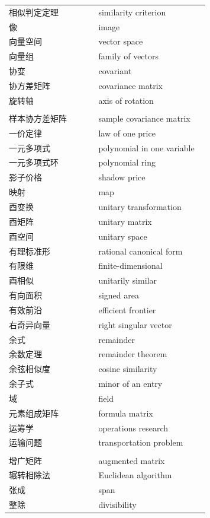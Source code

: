 {\begin{longtable}{p{0.42\linewidth}p{0.52\linewidth}}
		相似判定定理 & similarity criterion \\
		像 & image \\
		向量空间 & vector space \\
		向量组 & family of vectors \\
		协变 & covariant \\
		协方差矩阵 & covariance matrix \\
		旋转轴 & axis of rotation \\
		\addlinespace
		\multicolumn{2}{l}{\textbf{\sffamily Y}} \\
		样本协方差矩阵 & sample covariance matrix \\
		一价定律 & law of one price \\
		一元多项式 & polynomial in one variable \\
		一元多项式环 & polynomial ring \\
		影子价格 & shadow price \\
		映射 & map \\
		酉变换 & unitary transformation \\
		酉矩阵 & unitary matrix \\
		酉空间 & unitary space \\
		有理标准形 & rational canonical form \\
		有限维 & finite-dimensional \\
		酉相似 & unitarily similar \\
		有向面积 & signed area \\
		有效前沿 & efficient frontier \\
		右奇异向量 & right singular vector \\
		余式 & remainder \\
		余数定理 & remainder theorem \\
		余弦相似度 & cosine similarity \\
		余子式 & minor of an entry \\
		域 & field \\
		元素组成矩阵 & formula matrix \\
		运筹学 & operations research \\
		运输问题 & transportation problem \\
		\addlinespace
		\multicolumn{2}{l}{\textbf{\sffamily Z}} \\
		增广矩阵 & augmented matrix \\
		辗转相除法 & Euclidean algorithm \\
		张成 & span \\
		整除 & divisibility \\

\end{longtable}}
